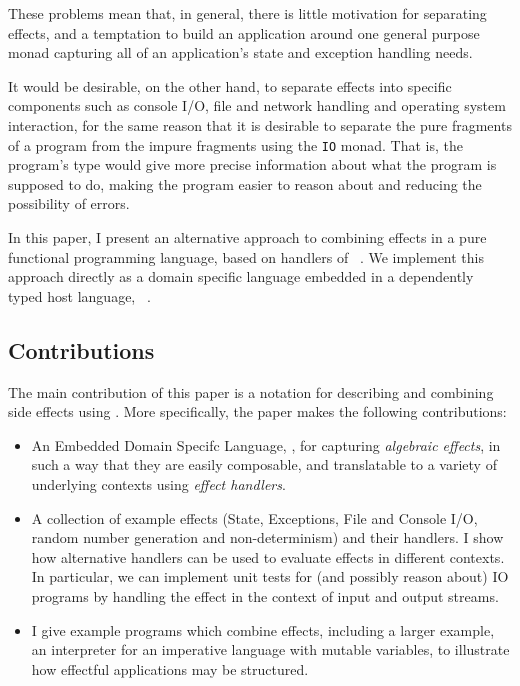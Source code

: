 \noindent
These problems mean that, in general, there is little motivation for separating
effects, and a temptation to build an application around one general purpose
monad capturing all of an application's state and exception handling needs.

It would be desirable, on the other hand, to separate effects into specific
components such as console I/O, file and network handling and operating system
interaction, for the same reason that it is desirable to separate the pure
fragments of a program from the impure fragments using the \texttt{IO} monad.
That is, the program's type would give more precise information about what the
program is supposed to do, making the program easier to reason about and
reducing the possibility of errors.

In this paper, I present an alternative approach to combining effects in
a pure functional programming language, based on handlers of
~\cite{Bauer}.
We implement this approach directly as a domain specific language embedded
in a dependently typed host language, \Idris{}~\cite{Brady2013,idristutorial}.

\subsection{Contributions}

The main contribution of this paper is a notation for describing and combining
side effects using \Idris{}. More specifically, the paper makes the
following contributions:

\begin{itemize}
\item An Embedded Domain Specifc Language, \Eff{}, for capturing \emph{algebraic
effects}, in such a way that they are easily composable, and translatable to a
variety of underlying contexts using \emph{effect handlers}.
\item A collection of example effects (State, Exceptions,
File and Console I/O, random number generation and
non-determinism) and their handlers. I show how alternative handlers
can be used to evaluate effects in different contexts. In particular, we can
implement unit tests for (and possibly reason about) IO programs by handling
the effect in the context of input and output streams.
\item I give example programs which combine effects, including a larger
example, an interpreter for an imperative language with mutable variables, to
illustrate how effectful applications may be structured.
\end{itemize}

